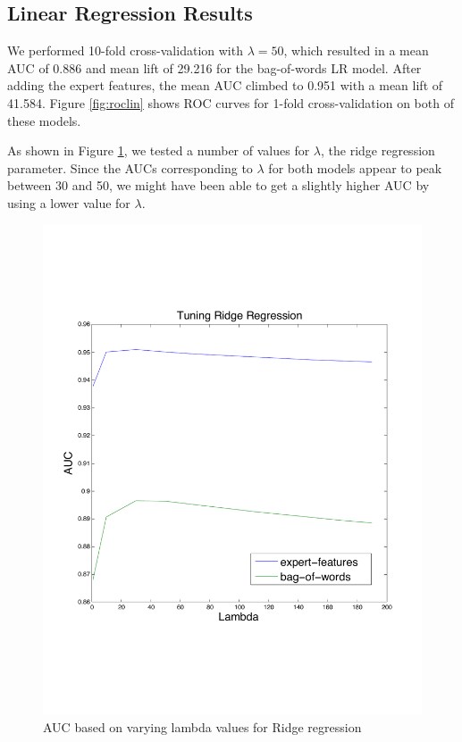 \documentclass[preprint]{acm_proc_article-sp}
\begin{document}
\subsection{Linear Regression Results}

We performed 10-fold cross-validation with $\lambda=50$, which resulted in a mean AUC of 0.886 and mean lift of 
29.216 for the bag-of-words LR model. After adding the expert features, the mean AUC climbed to 0.951 with a mean 
lift of 41.584. Figure \ref{fig:roclin} shows ROC curves for 1-fold cross-validation on both of these models.

As shown in Figure \ref{fig:lambda}, we tested a number of values for $\lambda$, the ridge regression parameter. 
Since the AUCs corresponding to $\lambda$ for both models appear to peak between 30 and 50, we might have been able to 
get a slightly higher AUC by using a lower value for $\lambda$.

\begin{figure}[h]
    \centering
    \includegraphics[width=\linewidth]{figures/linear-ridge.pdf}
    \caption{AUC based on varying lambda values for Ridge regression}
    \label{fig:lambda}
\end{figure}
\end{document}
